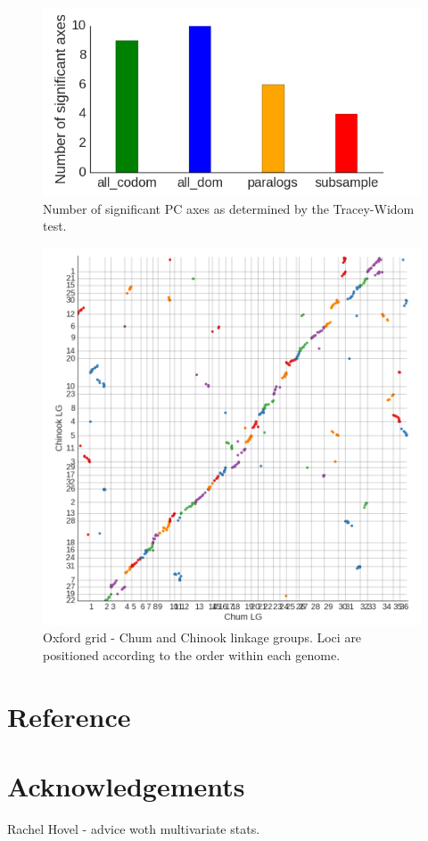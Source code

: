 \documentclass[12pt,  one column]{article}
\begin{document}
\begin{figure}[H]
\includegraphics[scale=.4]{figures/supplemental/TW_stats.png}
\caption{Number of significant PC axes as determined by the Tracey-Widom test.}
\end{figure}

\begin{figure}[H]
\includegraphics[scale=.25]{figures/supplemental/synteny_chinook.png}
\caption{Oxford grid - Chum and Chinook linkage groups.  Loci are positioned according to the order within each genome.}
\end{figure}


\section*{Reference}




\section*{Acknowledgements}
Rachel Hovel - advice woth multivariate stats.
\end{document}
